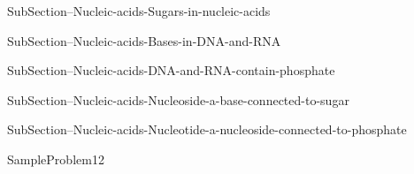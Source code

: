 \documentclass[main.tex]{subfiles}
\begin{document}
\sloppy\begin{description}

\item[] {SubSection--Nucleic-acids-Sugars-in-nucleic-acids}



\item[] 
{SubSection--Nucleic-acids-Bases-in-DNA-and-RNA}




\item[] 
{SubSection--Nucleic-acids-DNA-and-RNA-contain-phosphate}



\item[] 
{SubSection--Nucleic-acids-Nucleoside-a-base-connected-to-sugar}



\item[] 
{SubSection--Nucleic-acids-Nucleotide-a-nucleoside-connected-to-phosphate}

  {SampleProblem12}

\end{description}


\checkoddpage\ifoddpage \clearpage\thispagestyle{empty}\mbox{}\clearpage \else  \fi 
\end{document}
